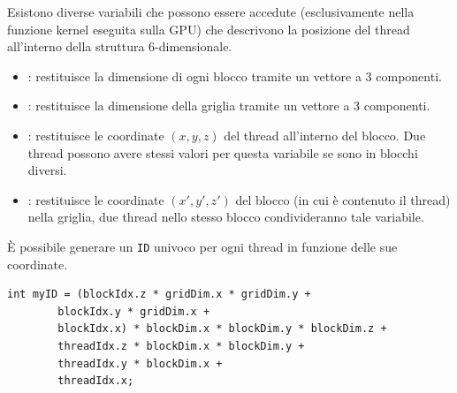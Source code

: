 \documentclass[10pt, letterpaper]{report}
\begin{document}
Esistono diverse variabili che possono essere accedute (esclusivamente nella funzione kernel eseguita sulla GPU) che descrivono la posizione del thread all'interno della struttura 6-dimensionale.\begin{itemize}
    \item {} : restituisce la dimensione di ogni blocco tramite un vettore a 3 componenti.
    \item {} : restituisce la dimensione della griglia tramite un vettore a 3 componenti.
    \item {} : restituisce le coordinate $(x,y,z)$ del thread all'interno del blocco. Due thread possono avere stessi valori per questa variabile se sono in blocchi diversi. 
    \item {} :  restituisce le coordinate $(x',y',z')$ del blocco (in cui è contenuto il thread) nella griglia, due thread nello stesso blocco condivideranno tale variabile.
\end{itemize}
È possibile generare un \texttt{ID} univoco per ogni thread in funzione delle sue coordinate.
\begin{lstlisting}[style=CStyle]
int myID = (blockIdx.z * gridDim.x * gridDim.y +
        blockIdx.y * gridDim.x +
        blockIdx.x) * blockDim.x * blockDim.y * blockDim.z +
        threadIdx.z * blockDim.x * blockDim.y +
        threadIdx.y * blockDim.x +
        threadIdx.x;
\end{lstlisting}
\end{document}
